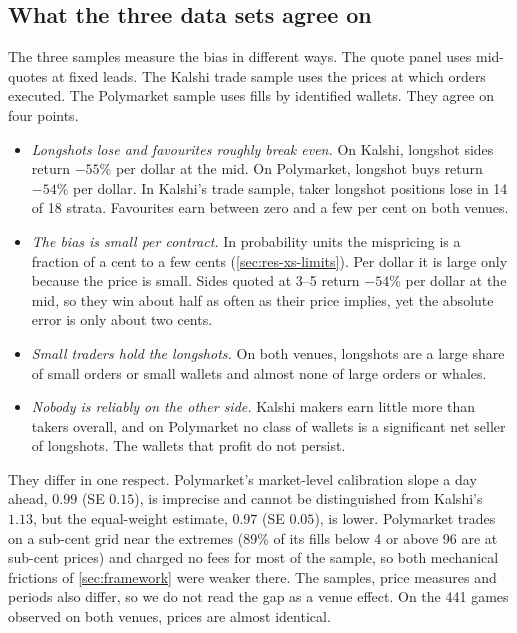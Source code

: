 \subsection{What the three data sets agree on}

The three samples measure the bias in different ways. The quote panel uses mid-quotes at fixed
leads. The Kalshi trade sample uses the prices at which orders executed. The Polymarket sample uses
fills by identified wallets. They agree on four points.
\begin{itemize}
  \item \emph{Longshots lose and favourites roughly break even.} On Kalshi, longshot sides return
  $-55\%$ per dollar at the mid. On Polymarket, longshot buys return $-54\%$ per dollar. In
  Kalshi's trade sample, taker longshot positions lose in 14 of 18 strata. Favourites earn between
  zero and a few per cent on both venues.
  \item \emph{The bias is small per contract.} In probability units the mispricing is a fraction
  of a cent to a few cents (\cref{sec:res-xs-limits}). Per dollar it is large only because the
  price is small. Sides quoted at 3--5\cents{} return $-54\%$ per dollar at the mid, so they win
  about half as often as their price implies, yet the absolute error is only about two cents.
  \item \emph{Small traders hold the longshots.} On both venues, longshots are a large share of
  small orders or small wallets and almost none of large orders or whales.
  \item \emph{Nobody is reliably on the other side.} Kalshi makers earn little more than takers
  overall, and on Polymarket no class of wallets is a significant net seller of longshots. The
  wallets that profit do not persist.
\end{itemize}
They differ in one respect. Polymarket's market-level calibration slope a day ahead, $0.99$
(SE $0.15$), is imprecise and cannot be distinguished from Kalshi's $1.13$, but the equal-weight
estimate, $0.97$ (SE $0.05$), is lower. Polymarket trades on a sub-cent grid near the extremes (89\% of
its fills below 4\cents{} or above 96\cents{} are at sub-cent prices)
and charged no fees for most of the sample, so both mechanical frictions of \cref{sec:framework} were
weaker there. The samples, price measures and periods also differ, so we do not read the gap as a
venue effect. On the 441 games observed on both venues, prices are almost identical.

